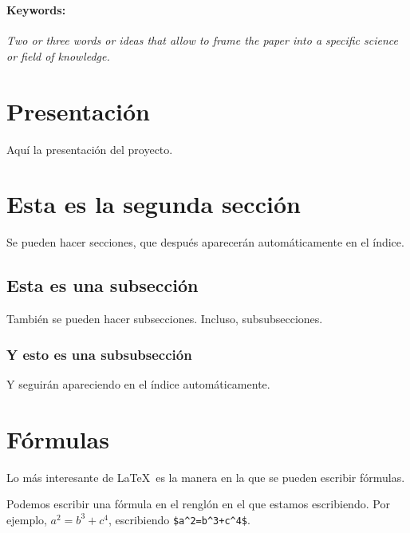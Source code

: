 \documentclass[a4paper,12pt]{article}
\begin{document}
{\


\paragraph{Keywords:} 
\textsl{
Two or three words or ideas that allow to frame the paper into a specific science or field of knowledge.}







\newpage


\tableofcontents

\newpage



\section{Presentación}

Aquí la presentación del proyecto.
%

\section{Esta es la segunda sección}

Se pueden hacer secciones, que después aparecerán automáticamente en el índice.

\subsection{Esta es una subsección}

También se pueden hacer subsecciones. Incluso, subsubsecciones.

\subsubsection{Y esto es una subsubsección}

Y seguirán apareciendo en el índice automáticamente.


\section{Fórmulas}

Lo más interesante de \LaTeX \ es la manera en la que se pueden escribir fórmulas.


Podemos escribir una fórmula en el renglón en el que estamos escribiendo. Por ejemplo, $a^2=b^3+c^4$, escribiendo \verb|$a^2=b^3+c^4$|.

}
\end{document}
